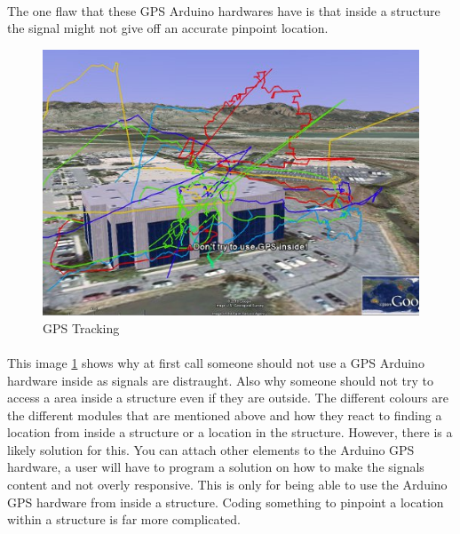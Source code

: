 \documentclass[12pt,a4paper]{article}
\begin{document}
\begin{appendices}
    \paragraph{}
      The one flaw that these GPS Arduino hardwares have is that inside a structure the signal might not give off an accurate pinpoint location.
      \begin{figure}[H]
        \centering
        \includegraphics[width=1\textwidth]{assets/12-6-1-gpsinside.jpg}
        \caption{GPS Tracking}
        \label{fig:GPS Tracking}
      \end{figure}
    \paragraph{}
      This image \ref{fig:GPS Tracking} shows why at first call someone should not use a GPS Arduino hardware inside as signals are distraught. Also why someone should not try to access a area inside a structure even if they are outside. The different colours are the different modules that are mentioned above and how they react to finding a location from inside a structure or a location in the structure. However, there is a likely solution for this. You can attach other elements to the Arduino GPS hardware, a user will have to program a solution on how to make the signals content and not overly responsive. This is only for being able to use the Arduino GPS hardware from inside a structure. Coding something to pinpoint a location within a structure is far more complicated.


\end{appendices}
\end{document}
